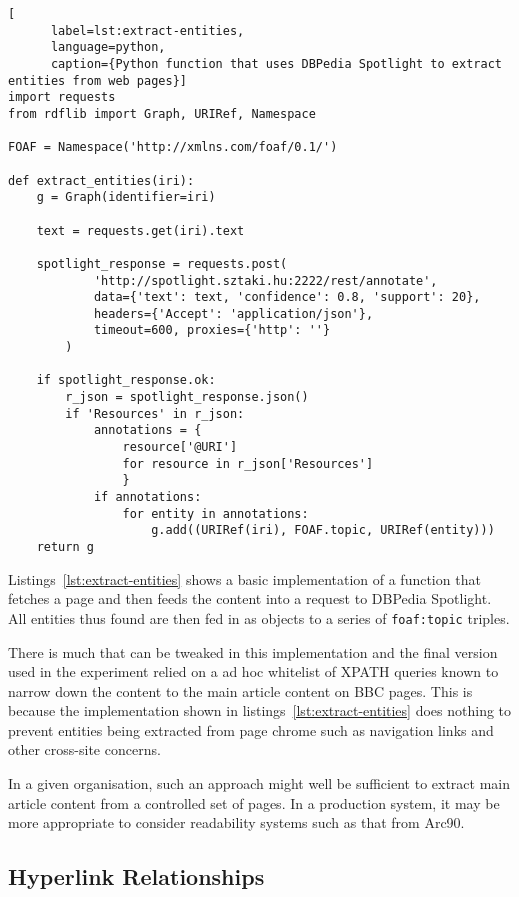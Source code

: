 \begin{centering}
  \begin{lstlisting}[
      label=lst:extract-entities,
      language=python,
      caption={Python function that uses DBPedia Spotlight to extract entities from web pages}]
import requests
from rdflib import Graph, URIRef, Namespace

FOAF = Namespace('http://xmlns.com/foaf/0.1/')
    
def extract_entities(iri):
    g = Graph(identifier=iri)

    text = requests.get(iri).text
    
    spotlight_response = requests.post(
            'http://spotlight.sztaki.hu:2222/rest/annotate',
            data={'text': text, 'confidence': 0.8, 'support': 20},
            headers={'Accept': 'application/json'},
            timeout=600, proxies={'http': ''}
        )

    if spotlight_response.ok:
        r_json = spotlight_response.json()
        if 'Resources' in r_json:
            annotations = {
                resource['@URI']
                for resource in r_json['Resources']
                }
            if annotations:
                for entity in annotations:
                    g.add((URIRef(iri), FOAF.topic, URIRef(entity)))
    return g
  \end{lstlisting}
\end{centering}

Listings~\ref{lst:extract-entities} shows a basic implementation of
a function that fetches a page and then feeds the content into a
request to DBPedia Spotlight. All entities thus found are then fed
in as objects to a series of \texttt{foaf:topic} triples.

There is much that can be tweaked in this implementation and the
final version used in the experiment relied on a ad hoc whitelist
of XPATH queries known to narrow down the content to the main article
content on BBC pages. This is because the implementation shown in
listings~\ref{lst:extract-entities} does nothing to prevent entities
being extracted from page
chrome such as navigation links and other cross-site concerns.

In a given organisation, such an approach might well be sufficient to
extract main article content from a controlled set of pages. In a
production system, it may be more appropriate to consider
readability systems such as that from Arc90.

\subsection{Hyperlink Relationships}




